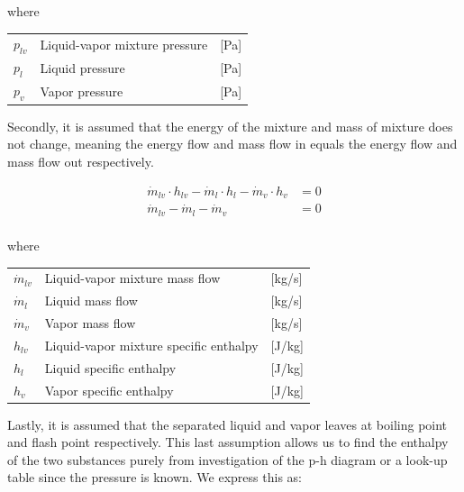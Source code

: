 where

\begin{center}
	\begin{tabular}{l p{8cm} l}
		$p_{lv}$				&  Liquid-vapor mixture pressure		& [\si{Pa}]\\
		$p_{l}$					&  Liquid pressure 						& [\si{Pa}] \\
		$p_{v}$					&  Vapor pressure						& [\si{Pa}]\\

	\end{tabular}
\end{center}


Secondly, it is assumed that the energy of the mixture and mass of mixture does not change, meaning the energy flow and mass flow in equals the energy flow and mass flow out respectively.

\begin{align}
	\dot{m}_{lv} \cdot  h_{lv}  - \dot{m}_{l} \cdot  h_{l} - \dot{m}_{v} \cdot  h_{v} & = 0 \label{eq:Flash_tank_energyflow} \\
	\dot{m}_{lv} - \dot{m}_{l} - \dot{m}_{v} & = 0  \label{eq:Flash_tank_massflow} \\
\end{align}

where

\begin{center}
	\begin{tabular}{l p{8cm} l}
		$\dot{m}_{lv}$			&  Liquid-vapor mixture mass flow			& [\si{kg}/\si{s}]\\
		$\dot{m}_{l}$			&  Liquid mass flow 						& [\si{kg}/\si{s}] \\
		$\dot{m}_{v}$			&  Vapor mass flow							& [\si{kg}/\si{s}]\\
		$h_{lv}$				&  Liquid-vapor mixture specific enthalpy	& [\si{J}/\si{kg}]\\
		$h_{l}$					&  Liquid specific enthalpy 				& [\si{J}/\si{kg}] \\
		$h_{v}$					&  Vapor specific enthalpy					& [\si{J}/\si{kg}]\\

	\end{tabular}
\end{center}


Lastly, it is assumed that the separated liquid and vapor leaves at boiling point and flash point respectively. This last assumption allows us to find the enthalpy of the two substances purely from investigation of the p-h diagram or a look-up table since the pressure is known. We express this as:


